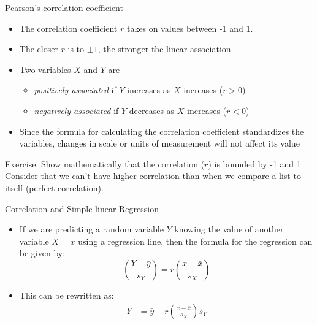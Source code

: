 \documentclass[10pt,handout]{beamer}\usepackage[]{graphicx}\usepackage[]{color}
\begin{document}
						
\begin{frame}{Pearson's correlation coefficient}
	\protect\hypertarget{two-numerical-variables}{}
	
	\begin{itemize}
		
		
		\item
		The correlation coefficient \(r\) takes on values between -1 and 1.
		\pause 
		\item
		The closer \(r\) is to \(\pm 1\), the stronger the linear association.
		\pause 
		
		\item 	Two variables \(X\) and \(Y\) are
		
		\begin{itemize}
			\item
			\emph{positively associated} if \(Y\) increases as \(X\) increases ($r>0$)
			\item
			\emph{negatively associated} if \(Y\) decreases as \(X\) increases ($r<0$)
		\end{itemize}
	
	\pause 
	
	\item Since the formula for calculating the correlation coefficient standardizes the variables, changes in scale or units of measurement will not affect its value
		
	\end{itemize}
	
	
\end{frame}





\begin{frame}{Exercise: Show mathematically that the correlation ($r$) is bounded by -1 and 1}
	\pause 
	Consider that we can't have higher correlation than when we compare a list to itself (perfect correlation).
	\vspace{4in}
\end{frame}


\begin{frame}{Correlation and Simple linear Regression}
	\begin{itemize}
		\item 
If we are predicting a random variable $Y$ knowing the value of another
variable $X=x$ using a regression line, then the formula for the regression can be given by:
\begin{equation}
\left(\frac{Y-\bar{y}}{s_{Y}}\right)=r\left(\frac{x-\bar{x}}{s_{X}}\right)
\end{equation}

\item This can be rewritten as:
\begin{align}
Y &= \bar{y}+r\left(\frac{x-\bar{x}}{s_{X}}\right) s_{Y}
\end{align}

	\end{itemize}
\end{frame}
\end{document}
